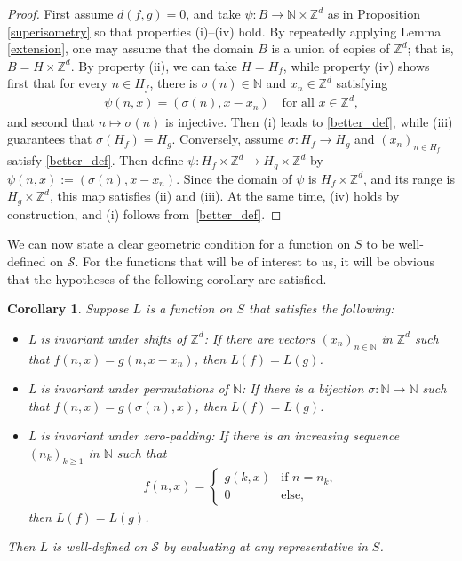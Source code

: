 \documentclass[11pt,reqno]{amsart}
\numberwithin{equation}{section}
\newtheorem{cor}[thm]{Corollary}
\theoremstyle{definition}
\begin{document}
\begin{proof}
First assume $d(f,g) = 0$, and take $\psi : B \to {\mathbb{N}} \times {\mathbb{Z}}^d$ as in Proposition \ref{superisometry} so that properties (i)--(iv) hold.
By repeatedly applying Lemma \ref{extension},
one may assume that the domain $B$ is a union of copies of ${\mathbb{Z}}^d$; that is, $B = H \times {\mathbb{Z}}^d$.
By property (ii), we can take $H = H_f$, while property (iv) shows first that for every $n \in H_f$, there is $\sigma(n) \in {\mathbb{N}}$ and $x_n \in {\mathbb{Z}}^d$ satisfying
{\begin{align*} {
\psi(n,x) = (\sigma(n),x-x_n) \quad \text{for all $x \in {\mathbb{Z}}^d$,}
} \end{align*}}
and second that $n \mapsto \sigma(n)$ is injective.
Then (i) leads to \eqref{better_def}, while (iii) guarantees that $\sigma(H_f) = H_g$. Conversely, assume $\sigma : H_f \to H_g$ and $(x_n)_{n \in H_f}$ satisfy \eqref{better_def}.
Then define $\psi : H_f \times {\mathbb{Z}}^d \to H_g \times {\mathbb{Z}}^d$ by $\psi(n,x) := (\sigma(n),x-x_n)$.
Since the domain of $\psi$ is $H_f \times {\mathbb{Z}}^d$, and its range is $H_g \times {\mathbb{Z}}^d$, this map satisfies (ii) and (iii).
At the same time, (iv) holds by construction, and (i) follows from~\eqref{better_def}.
\end{proof}

We can now state a clear geometric condition for a function on $S$ to be well-defined on ${\mathcal{S}}$.
For the functions that will be of interest to us, it will be obvious that the hypotheses of the following corollary are satisfied.

\begin{cor} \label{defined_pspm}
Suppose $L$ is a function on $S$ that satisfies the following:
\begin{itemize}
\item[(i)] L is invariant under shifts of ${\mathbb{Z}}^d$: If there are vectors $(x_n)_{n \in {\mathbb{N}}}$ in ${\mathbb{Z}}^d$ such that $f(n,x) = g(n,x-x_n)$, then $L(f) = L(g)$.
\item[(ii)] L is invariant under permutations of ${\mathbb{N}}$: If there is a bijection $\sigma : {\mathbb{N}} \to {\mathbb{N}}$ such that $f(n,x) = g(\sigma(n),x)$, then $L(f) = L(g)$.
\item[(iii)] L is invariant under zero-padding: If there is an increasing sequence $(n_k)_{k \geq 1}$ in ${\mathbb{N}}$ such that
{\begin{align*} {
f(n,x) = \begin{cases}
g(k,x) &\text{if } n = n_k, \\
0 &\text{else},
\end{cases}
} \end{align*}}
then $L(f) = L(g)$.
\end{itemize}
Then $L$ is well-defined on ${\mathcal{S}}$ by evaluating at any representative in $S$.
\end{cor}
\end{document}
